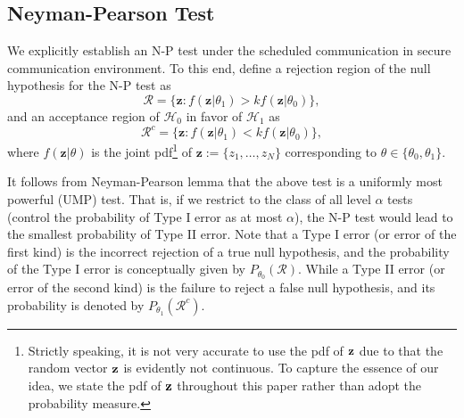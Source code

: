 \documentclass[journal]{IEEEtran}
\def\cH{\mathcal{H}}
\def\cR{\mathcal{R}}
\begin{document}
\subsection{Neyman-Pearson Test}
We explicitly establish an N-P test under the scheduled communication in secure communication environment.  To this end, define a rejection region of the null hypothesis for the N-P test as
\begin{equation*}
\cR=\{\textbf{z}:f(\textbf{z}|\theta_{1})>kf(\textbf{z}|\theta_{0})\},
\end{equation*}
and an
acceptance region of $\cH_0$ in favor of $\cH_1$ as
\begin{equation*}
\cR^{c}=\{\textbf{z}:f(\textbf{z}|\theta_{1})<kf(\textbf{z}|\theta_{0})\},
\end{equation*}
where $f(\textbf{z}|\theta)$ is the joint pdf\footnote{Strictly speaking, it is not very accurate to use the pdf of ${\bf z}$ due to that the random vector ${\bf z}$ is evidently not continuous. To capture the essence of  our idea,  we state the pdf of ${\bf z}$ throughout this paper rather than adopt the probability measure.} of $\textbf{z}:=\{z_{1},\ldots, z_{N}\}$ corresponding to $\theta\in\{\theta_0,\theta_1\}$.

It follows from Neyman-Pearson lemma \cite{casella2001statistical} that the above test is a uniformly most powerful (UMP) test. That is, if we restrict to the class of all level $\alpha$ tests (control the probability of Type I error as at most $\alpha$), the N-P test would lead to the smallest probability of Type II error.  Note that a Type I error (or error of the first kind) is the incorrect rejection of a true null hypothesis, and the probability of the Type I error is conceptually given by $P_{\theta_0}(\cR)$. While a Type II error (or error of the second kind) is the failure to reject a false null hypothesis, and its probability is denoted by $P_{\theta_1}(\cR^c)$.
\end{document}
